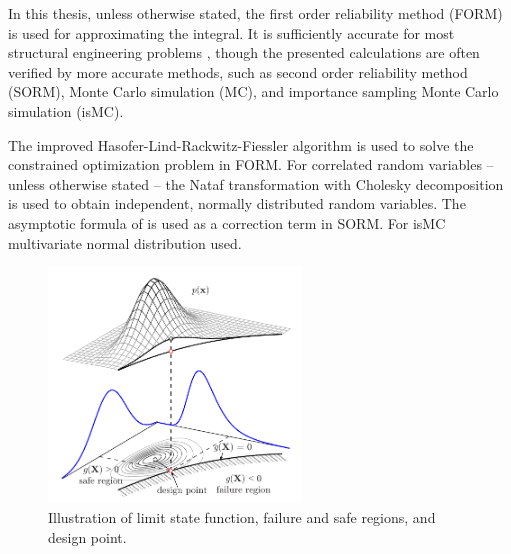 In this thesis, unless otherwise stated, the first order reliability method (FORM) \citep{Hasofer1974} is used for approximating the integral. It is sufficiently accurate for most structural engineering problems \citep{EN0}, though the presented calculations are often verified by more accurate methods, such as second order reliability method (SORM), Monte Carlo simulation (MC), and importance sampling Monte Carlo simulation (isMC).

The improved Hasofer-Lind-Rackwitz-Fiessler algorithm \citep{Rackwitz1979, Zhang1995} is used to solve the constrained optimization problem in FORM. For correlated random variables -- unless otherwise stated -- the Nataf transformation \citep{Liu1986} with Cholesky decomposition is used to obtain independent, normally distributed random variables. The asymptotic formula of \citet{Breitung1984} is used as a correction term in SORM. For isMC multivariate normal distribution used.

\begin{figure}[htbp!] 
	\centering    
	\includegraphics[width=0.6\textwidth]{joint_dens_illustration_fine_db.pdf}
	\caption{Illustration of limit state function, failure and safe regions, and design point.}
	\label{fig:joint_dens}
\end{figure}